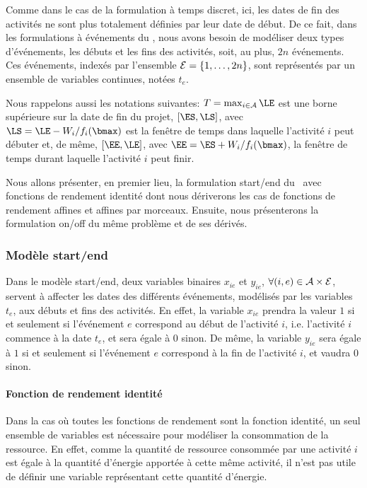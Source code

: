 Comme dans le cas de la formulation à temps discret, ici, les dates de
fin des activités ne sont plus totalement définies par leur date de
début. De ce fait, dans les formulations à événements du \CECSP, nous
avons besoin de modéliser deux types d'événements, les débuts et les
fins des activités, soit, au plus, $2n$ événements. Ces événements,
indexés par l'ensemble ${\cal E}=\{1,\dots,2n\}$, sont représentés par un
ensemble de variables continues, notées $t_e$.

Nous rappelons aussi les notations suivantes: $T=\max_{i \in \A}
\LE$ est une borne supérieure sur la date de fin du projet,
$[\ES,\LS]$, avec $\LS= \LE-W_i/f_i(\bmax)$ est la fenêtre de temps
dans laquelle l'activité $i$ peut débuter et, de même, $[\EE,\LE]$,
avec $\EE=\ES + W_i/f_i(\bmax)$, la fenêtre de temps durant laquelle
l'activité $i$ peut finir.

Nous allons présenter, en premier lieu, la formulation start/end du
\CECSP~avec fonctions de rendement identité dont nous dériverons 
les cas de fonctions de rendement affines et affines par morceaux.
Ensuite, nous présenterons la formulation on/off du même problème et
de ses dérivés.

\subsubsection{Modèle start/end}

Dans le modèle start/end, deux variables binaires $x_{ie}$ et
$y_{ie}$, $\forall (i,e) \in {\cal A}\times {\cal E}$, 
servent à affecter les dates des différents événements, modélisés par
les variables $t_e$, aux débuts et fins des activités. En effet, la
variable $x_{ie}$ prendra la valeur $1$ si et seulement si l'événement
$e$ correspond au début de l'activité $i$, i.e. l'activité $i$
commence à la date $t_e$, et sera égale à $0$ sinon. De même, la
variable $y_{ie}$ sera égale à $1$ si et seulement si l'événement $e$
correspond à la fin de l'activité $i$, et vaudra $0$ sinon.

\paragraph{Fonction de rendement identité}

Dans la cas où toutes les fonctions de rendement sont la fonction
identité, un seul ensemble de variables est nécessaire pour modéliser
la consommation de la ressource. En effet, comme la quantité de
ressource consommée par une activité $i$ est égale à la quantité
d'énergie apportée à cette même activité, il n'est pas utile de
définir une variable représentant cette quantité d'énergie.

